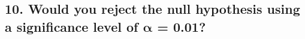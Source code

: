 \documentclass[12pt,oneside]{book}
\begin{document}
\begin{minipage}{.96\textwidth}
\subsection*{10. Would you reject the null hypothesis using a significance level of $\boldsymbol{\alpha}$ = 0.01?}
\ifdim \pvalue pt>0.01pt {
I would not reject the null hypothesis at $\alpha = 0.01$ as $p=\pvalue>0.01$. Also $0 \in \intervalB$.
} \else {
I would reject the null hypothesis at $\alpha = 0.01$ as $p=\pvalue<0.01$. Also $0 \not\in \intervalB$.
} \fi
\end{minipage}%
\end{document}
